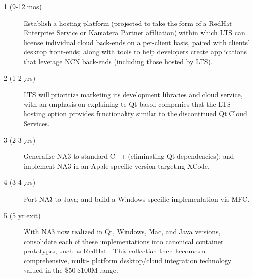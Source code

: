 \begin{frame}{}
\hspace{20pt}\begin{minipage}{.995\textwidth}
{\LARGE {}\selectfont \setlength{\leftmargini}{3pt}\begin{description}
\item[1 (9-12 mos)] Establish a hosting platform 
(projected to take the form of a 
RedHat Enterprise Service or Kamatera Partner affiliation) within which 
LTS can license individual cloud back-ends 
on a per-client basis, paired with 
clients' desktop front-ends; along with tools 
to help developers create applications 
that leverage 
NCN back-ends (including those hosted by 
LTS).
\vspace{8pt}
\item[2 (1-2 yrs)]  
LTS will prioritize marketing its development libraries 
and cloud service, 
with an emphasis on explaining to Qt-based 
companies that the LTS hosting option provides 
functionality similar to the discontinued 
Qt Cloud Services.   
\vspace{8pt}
\item[3 (2-3 yrs)] Generalize NA3 to standard 
C++ (eliminating Qt dependencies); and 
implement NA3 in an Apple-specific version 
targeting XCode.  
\vspace{8pt}
\item[4 (3-4 yrs)] Port NA3 to Java; and 
build a Windows-specific implementation 
via MFC.
\vspace{8pt}
\item[5 (5 yr exit)] With NA3 now realized 
in Qt, Windows, Mac, and Java versions, 
consolidate each of these implementations 
into canonical container prototypes, 
such as RedHat .  This 
collection then becomes 
a comprehensive, multi- platform 
desktop/cloud integration technology 
valued in the \$50-\$100M range.
\end{description}}\end{minipage}


\end{frame}
